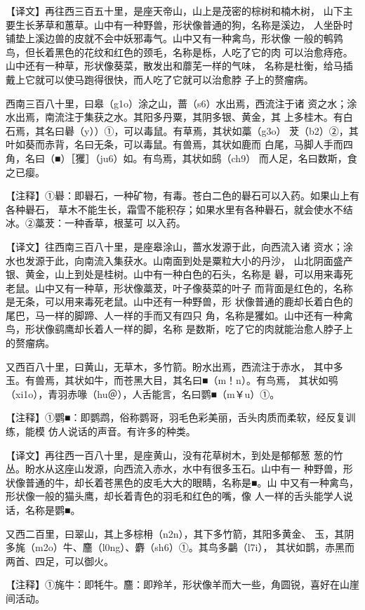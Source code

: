 \documentclass[a4paper,12pt,UTF8,twoside]{ctexbook}
\begin{document}
【译文】再往西三百五十里，是座天帝山，山上是茂密的棕树和楠木树， 山下主要生长茅草和蕙草。山中有一种野兽，形状像普通的狗，名称是溪边， 人坐卧时铺垫上溪边兽的皮就不会中妖邪毒气。山中又有一种禽鸟，形状像 一般的鹌鹑鸟，但长着黑色的花纹和红色的颈毛，名称是栎，人吃了它的肉 可以治愈痔疮。山中还有一种草，形状像葵菜，散发出和蘼芜一样的气味， 名称是杜衡，给马插戴上它就可以使马跑得很快，而人吃了它就可以治愈脖 子上的赘瘤病。

西南三百八十里，曰皋（g1o）涂之山，蔷（s6）水出焉，西流注于诸 资之水；涂水出焉，南流注于集获之水。其阳多丹粟，其阴多银、黄金，其 上多桂木。有白石焉，其名曰礜（y））①，可以毒鼠。有草焉，其状如藁（g3o） 茇（b2）②，其叶如葵而赤背，名曰无条，可以毒鼠。有兽焉，其状如鹿而 白尾，马脚人手而四角，名曰（■）［玃］（ju6）如。有鸟焉，其状如鸱（ch9） 而人足，名曰数斯，食之已瘿。

【注释】①礜：即礜石，一种矿物，有毒。苍白二色的礜石可以入药。如果山上有各种礜石， 草木不能生长，霜雪不能积存；如果水里有各种礜石，就会使水不结冰。②藁茇：一种香草，根茎可 以入药。

【译文】往西南三百八十里，是座皋涂山，蔷水发源于此，向西流入诸 资水；涂水也发源于此，向南流入集获水。山南面到处是粟粒大小的丹沙， 山北阴面盛产银、黄金，山上到处是桂树。山中有一种白色的石头，名称是 礜，可以用来毒死老鼠。山中又有一种草，形状像藁茇，叶子像葵菜的叶子 而背面是红色的，名称是无条，可以用来毒死老鼠。山中还有一种野兽，形 状像普通的鹿却长着白色的尾巴，马一样的脚蹄、人一样的手而又有四只 角，名称是玃如。山中还有一种禽鸟，形状像鹞鹰却长着人一样的脚，名称 是数斯，吃了它的肉就能治愈人脖子上的赘瘤病。

又西百八十里，曰黄山，无草木，多竹箭。盼水出焉，西流注于赤水， 其中多玉。有兽焉，其状如牛，而苍黑大目，其名曰■（m！n）。有鸟焉， 其状如鸮（xi1o），青羽赤喙（hu＠），人舌能言，名曰鹦■（m￥u）①。

【注释】①鹦■：即鹦鹉，俗称鹦哥，羽毛色彩美丽，舌头肉质而柔软，经反复训练，能模 仿人说话的声音。有许多的种类。

【译文】再往西一百八十里，是座黄山，没有花草树木，到处是郁郁葱 葱的竹丛。盼水从这座山发源，向西流入赤水，水中有很多玉石。山中有一 种野兽，形状像普通的牛，却长着苍黑色的皮毛大大的眼睛，名称是■。山 中又有一种禽鸟，形状像一般的猫头鹰，却长着青色的羽毛和红色的嘴，像 人一样的舌头能学人说话，名称是鹦■。

又西二百里，曰翠山，其上多棕枏（n2n），其下多竹箭，其阳多黄金、 玉，其阴多旄（m2o）牛、麢（l0ng）、麝（sh6）①。其鸟多鸓（l7i）， 其状如鹊，赤黑而两首、四足，可以御火。

【注释】①旄牛：即牦牛。麢：即羚羊，形状像羊而大一些，角圆锐，喜好在山崖间活动。
\end{document}
